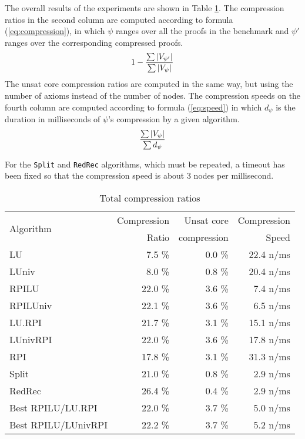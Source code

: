 \documentclass{llncs}
\begin{document}
The overall results of the experiments are shown in Table \ref{tab:average}. The compression ratios
in the second column are computed according to formula (\ref{eq:compression}), in which $\psi$
ranges over all the proofs in the benchmark and $\psi'$ ranges over the corresponding compressed
proofs.
\begin{equation} \label{eq:compression}
  1 - \frac{ \sum {|V_{\psi'}|} }{ \sum {|V_{\psi}|} }
\end{equation}
The unsat core compression ratios are computed in the same way, but using the number of axioms instead of
the number of nodes. The compression speeds on the fourth column are computed according to formula
(\ref{eq:speed}) in which $d_{\psi}$ is the duration in milliseconds of $\psi$'s compression by a
given algorithm.
\begin{equation} \label{eq:speed}
  \frac{ \sum {|V_{\psi}|} }{ \sum {d_{\psi}} }
\end{equation}

For the \texttt{Split} and \texttt{RedRec} algorithms, which must be repeated, a timeout has
been fixed so that the compression speed is about 3 nodes per millisecond. 


\begin{table}[tb]
  \caption{Total compression ratios}
  \label{tab:average}
  \centering
  \begin{tabular}{lrrr}
    \toprule
    \multirow{2}{*}{Algorithm} & Compression & Unsat core  & Compression \\
                               &       Ratio & compression &       Speed \\
    \midrule
    LU                &  7.5 \% &  0.0 \% & 22.4 n/ms \\
    LUniv             &  8.0 \% &  0.8 \% & 20.4 n/ms \\
    RPILU             & 22.0 \% &  3.6 \% &  7.4 n/ms \\
    RPILUniv          & 22.1 \% &  3.6 \% &  6.5 n/ms \\
    LU.RPI            & 21.7 \% &  3.1 \% & 15.1 n/ms \\
    LUnivRPI          & 22.0 \% &  3.6 \% & 17.8 n/ms \\
    RPI               & 17.8 \% &  3.1 \% & 31.3 n/ms \\
    Split             & 21.0 \% &  0.8 \% &  2.9 n/ms \\
    RedRec            & 26.4 \% &  0.4 \% &  2.9 n/ms \\
    Best RPILU/LU.RPI       & 22.0 \% &  3.7 \% &  5.0 n/ms \\
    Best RPILU/LUnivRPI & 22.2 \% &  3.7 \% &  5.2 n/ms \\
    \bottomrule
  \end{tabular}
\end{table}
\end{document}
